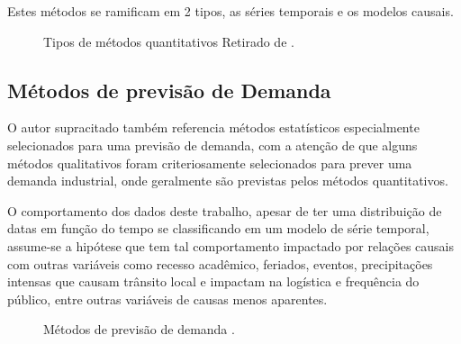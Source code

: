 \documentclass[	12pt, Times, openright, twoside, a4paper, english, brazil]{abntex2}
\begin{document}
          Estes métodos se ramificam em 2 tipos, as séries temporais e os modelos causais.
          \begin{figure}[!ht]
          	\caption{Tipos de métodos quantitativos Retirado de \cite{Junior2007}.\label{fig:metodosQuantitativos}}
          \end{figure}

        \subsection{Métodos de previsão de Demanda}
          O autor supracitado também referencia métodos estatísticos especialmente selecionados para uma previsão de demanda, com a atenção de que alguns métodos qualitativos foram criteriosamente selecionados para prever uma demanda industrial, onde geralmente são previstas pelos métodos quantitativos.

          O comportamento dos dados deste trabalho, apesar de ter uma distribuição de datas em função do tempo se classificando em um modelo de série temporal, assume-se a hipótese que tem tal comportamento impactado por relações causais com outras variáveis como recesso acadêmico, feriados, eventos, precipitações intensas que causam trânsito local e impactam na logística e frequência do público, entre outras variáveis de causas menos aparentes.

          \begin{figure}[!ht]
          	\caption{Métodos de previsão de demanda \cite{Junior2007}.\label{fig:metodosPrevisaoDemanda}}
          \end{figure}
\end{document}
